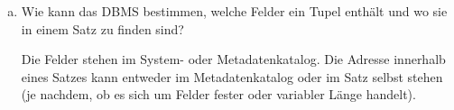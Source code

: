 \begin{enumerate}[a)]
	\item Wie kann das DBMS bestimmen, welche Felder ein Tupel enthält und wo sie in einem Satz zu finden sind?

	\begin{solution}
	Die Felder stehen im System- oder Metadatenkatalog. Die Adresse innerhalb eines Satzes kann entweder im Metadatenkatalog oder im Satz selbst stehen (je nachdem, ob es sich um Felder fester oder variabler Länge handelt).
	\end{solution}

\end{enumerate}
